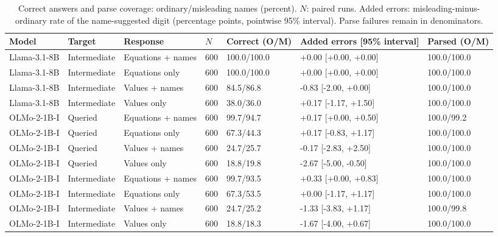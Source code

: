 \begin{table}[t]
\centering\small\setlength{\tabcolsep}{3pt}
\begin{tabular}{@{}p{}p{}p{}p{}p{}p{}p{}@{}}
\toprule
Model & Target & Response & $N$ & Correct (O/M) & Added errors [95\% interval] & Parsed (O/M) \\
\midrule
Llama-3.1-8B & Intermediate & Equations + names & 600 & 100.0/100.0 & +0.00 [+0.00, +0.00] & 100.0/100.0 \\
Llama-3.1-8B & Intermediate & Equations only & 600 & 100.0/100.0 & +0.00 [+0.00, +0.00] & 100.0/100.0 \\
Llama-3.1-8B & Intermediate & Values + names & 600 & 84.5/86.8 & -0.83 [-2.00, +0.00] & 100.0/100.0 \\
Llama-3.1-8B & Intermediate & Values only & 600 & 38.0/36.0 & +0.17 [-1.17, +1.50] & 100.0/100.0 \\
OLMo-2-1B-I & Queried & Equations + names & 600 & 99.7/94.7 & +0.17 [+0.00, +0.50] & 100.0/99.2 \\
OLMo-2-1B-I & Queried & Equations only & 600 & 67.3/44.3 & +0.17 [-0.83, +1.17] & 100.0/100.0 \\
OLMo-2-1B-I & Queried & Values + names & 600 & 24.7/25.7 & -0.17 [-2.83, +2.50] & 100.0/100.0 \\
OLMo-2-1B-I & Queried & Values only & 600 & 18.8/19.8 & -2.67 [-5.00, -0.50] & 100.0/100.0 \\
OLMo-2-1B-I & Intermediate & Equations + names & 600 & 99.7/93.5 & +0.33 [+0.00, +0.83] & 100.0/100.0 \\
OLMo-2-1B-I & Intermediate & Equations only & 600 & 67.3/53.5 & +0.00 [-1.17, +1.17] & 100.0/100.0 \\
OLMo-2-1B-I & Intermediate & Values + names & 600 & 24.7/25.2 & -1.33 [-3.83, +1.17] & 100.0/99.8 \\
OLMo-2-1B-I & Intermediate & Values only & 600 & 18.8/18.3 & -1.67 [-4.00, +0.67] & 100.0/100.0 \\
\bottomrule
\end{tabular}
\caption{Correct answers and parse coverage: ordinary/misleading names (percent). $N$: paired runs. Added errors: misleading-minus-ordinary rate of the name-suggested digit (percentage points, pointwise 95\% interval). Parse failures remain in denominators. }
\label{tab:r7-formats-cells-2}
\end{table}
